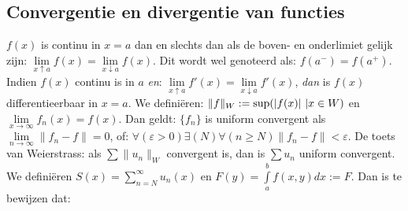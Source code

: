 \documentclass[twoside]{report}
\begin{document}
\subsection{Convergentie en divergentie van functies}
\label{sec:convf}
$f(x)$ is continu in $x=a$ dan en slechts dan als de boven- en onderlimiet
gelijk zijn: $\lim\limits_{x\uparrow a}f(x)=\lim\limits_{x\downarrow a}f(x)$.
Dit wordt wel genoteerd als: $f(a^-)=f(a^+)$.
\npar
Indien $f(x)$ continu is in $a$ {\it en}:
$\lim\limits_{x\uparrow a}f'(x)=\lim\limits_{x\downarrow a}f'(x)$,
{\it dan} is $f(x)$ differentieerbaar in $x=a$.
\npar
We defini\"eren: $\|f\|_W:={\rm sup}(|f(x)|~|x\in W)$ en $\lim\limits_{x\rightarrow\infty}f_n(x)=f(x)$.
Dan geldt: $\{f_n\}$ is uniform convergent als $\lim\limits_{n\rightarrow\infty}\|f_n-f\|=0$,
of: $\forall(\varepsilon>0)\exists(N)\forall(n\geq N)\|f_n-f\|<\varepsilon$.
\npar
De toets van Weierstrass: als $\sum\|u_n\|_W$ convergent is, dan is $\sum u_n$
uniform convergent.
\npar
We defini\"eren $\displaystyle S(x)=\sum_{n=N}^\infty u_n(x)$ en
$\displaystyle F(y)=\int\limits_a^bf(x,y)dx:=F$. Dan is te bewijzen dat:
\end{document}

